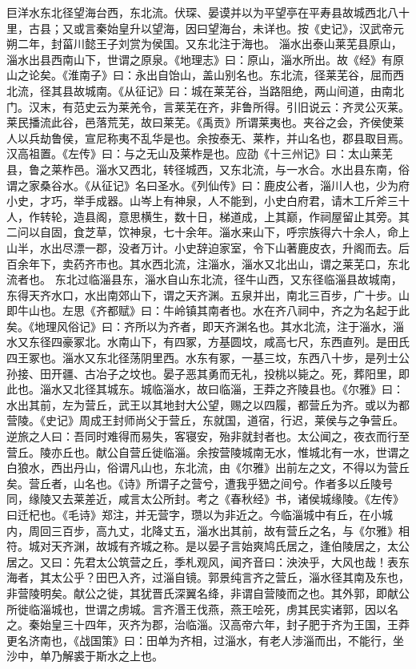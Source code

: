 \documentclass[12pt,UTF8]{ctexbook}
\begin{document}
巨洋水东北径望海台西，东北流。伏琛、晏谟并以为平望亭在平寿县故城西北八十里，古县；又或言秦始皇升以望海，因曰望海台，未详也。按《史记》，汉武帝元朔二年，封菑川懿王子刘赏为侯国。又东北注于海也。
淄水出泰山莱芜县原山，淄水出县西南山下，世谓之原泉。《地理志》曰：原山，淄水所出。故《经》有原山之论矣。《淮南子》曰：永出自饴山，盖山别名也。东北流，径莱芜谷，屈而西北流，径其县故城南。《从征记》曰：城在莱芜谷，当路阻绝，两山间道，由南北门。汉末，有范史云为莱羌令，言莱芜在齐，非鲁所得。引旧说云：齐灵公灭莱。莱民播流此谷，邑落荒芜，故曰莱芜。《禹贡》所谓莱夷也。夹谷之会，齐侯使莱人以兵劫鲁侯，宣尼称夷不乱华是也。余按泰无、莱柞，并山名也，郡县取目焉。汉高祖置。《左传》曰：与之无山及莱柞是也。应劭《十三州记》曰：太山莱芜县，鲁之莱柞邑。淄水又西北，转径城西，又东北流，与一水合。水出县东南，俗谓之家桑谷水。《从征记》名曰圣水。《列仙传》曰：鹿皮公者，淄川人也，少为府小史，才巧，举手成器。山岑上有神泉，人不能到，小史白府君，请木工斤斧三十人，作转轮，造县阁，意思横生，数十日，梯道成，上其巅，作祠屋留止其旁。其二问以自固，食芝草，饮神泉，七十余年。淄水来山下，呼宗族得六十余人，命上山半，水出尽漂一郡，没者万计。小史辞迫家室，令下山著鹿皮衣，升阁而去。后百余年下，卖药齐市也。其水西北流，注淄水，淄水又北出山，谓之莱芜口，东北流者也。
东北过临淄县东，淄水自山东北流，径牛山西，又东径临淄县故城南，东得天齐水口，水出南郊山下，谓之天齐渊。五泉并出，南北三百步，广十步。山即牛山也。左思《齐都赋》曰：牛岭镇其南者也。水在齐八祠中，齐之为名起于此矣。《地理风俗记》曰：齐所以为齐者，即天齐渊名也。其水北流，注于淄水，淄水又东径四豪冢北。水南山下，有四冢，方基圆坟，咸高七尺，东西直列。是田氏四王冢也。淄水又东北径荡阴里西。水东有冢，一基三坟，东西八十步，是列士公孙接、田开疆、古冶子之坟也。晏子恶其勇而无礼，投桃以毙之。死，葬阳里，即此也。淄水又北径其城东。城临淄水，故曰临淄，王莽之齐陵县也。《尔雅》曰：水出其前，左为营丘，武王以其地封大公望，赐之以四履，都营丘为齐。或以为都营陵。《史记》周成王封师尚父于营丘，东就国，道宿，行迟，莱侯与之争营丘。逆旅之人曰：吾同时难得而易失，客寝安，殆非就封者也。太公闻之，夜衣而行至营丘。陵亦丘也。献公自营丘徙临淄。余按营陵城南无水，惟城北有一水，世谓之白狼水，西出丹山，俗谓凡山也，东北流，由《尔雅》出前左之文，不得以为营丘矣。营丘者，山名也。《诗》所谓子之营兮，遭我乎峱之间兮。作者多以丘陵号同，缘陵又去莱差近，咸言太公所封。考之《春秋经》书，诸侯城缘陵。《左传》曰迁杞也。《毛诗》郑注，并无营字，瓒以为非近之。今临淄城中有丘，在小城内，周回三百步，高九丈，北降丈五，淄水出其前，故有营丘之名，与《尔雅》相符。城对天齐渊，故城有齐城之称。是以晏子言始爽鸠氏居之，逢伯陵居之，太公居之。又曰：先君太公筑营之丘，季札观风，闻齐音曰：泱泱乎，大风也哉！表东海者，其太公乎？田巴入齐，过淄自镜。郭景纯言齐之营丘，淄水径其南及东也，非营陵明矣。献公之徙，其犹晋氏深翼名绛，非谓自营陵而之也。其外郭，即献公所徙临淄城也，世谓之虏城。言齐湣王伐燕，燕王哙死，虏其民实诸郭，因以名之。秦始皇三十四年，灭齐为郡，治临淄。汉高帝六年，封子肥于齐为王国，王莽更名济南也，《战国策》曰：田单为齐相，过淄水，有老人涉淄而出，不能行，坐沙中，单乃解裘于斯水之上也。
\end{document}
